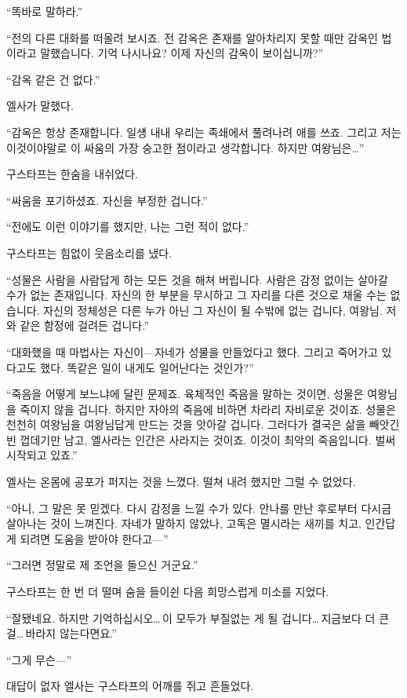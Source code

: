 ``똑바로 말하라.''

``전의 다른 대화를 떠올려 보시죠. 전 감옥은 존재를 알아차리지 못할 때만 감옥인 법이라고 말했습니다. 기억 나시나요? 이제 자신의 감옥이 보이십니까?''

``감옥 같은 건 없다.''

엘사가 말했다.

``감옥은 항상 존재합니다. 일섕 내내 우리는 족쇄에서 풀려나려 애를 쓰죠. 그리고 저는 이것이야말로 이 싸움의 가장 숭고한 점이라고 생각합니다. 하지만 여왕님은\ldots''

구스타프는 한숨을 내쉬었다.

``싸움을 포기하셨죠. 자신을 부정한 겁니다.''

``전에도 이런 이야기를 했지만, 나는 그런 적이 없다.''

구스타프는 힘없이 웃음소리를 냈다.

``성물은 사람을 사람답게 하는 모든 것을 해쳐 버립니다. 사람은 감정 없이는 살아갈 수가 없는 존재입니다. 자신의 한 부분을 무시하고 그 자리를 다른 것으로 채울 수는 없습니다. 자신의 정체성은 다른 누가 아닌 그 자신이 될 수밖에 없는 겁니다, 여왕님. 저와 같은 함정에 걸려든 겁니다.''

`` 대화했을 때 마법사는 자신이—자네가 성물을 만들었다고 했다. 그리고 죽어가고 있다고도 했다. 똑같은 일이 내게도 일어난다는 것인가?''

``죽음을 어떻게 보느냐에 달린 문제죠. 육체적인 죽음을 말하는 것이면, 성물은 여왕님을 죽이지 않을 겁니다. 하지만 자아의 죽음에 비하면 차라리 자비로운 것이죠. 성물은 천천히 여왕님을 여왕님답게 만드는 것을 앗아갈 겁니다. 그러다가 결국은 삶을 빼앗긴 빈 껍데기만 남고, 엘사라는 인간은 사라지는 것이죠. 이것이 최악의 죽음입니다. 벌써 시작되고 있죠.''

엘사는 온몸에 공포가 퍼지는 것을 느꼈다. 떨쳐 내려 했지만 그럴 수 없었다.

``아니, 그 말은 못 믿겠다. 다시 감정을 느낄 수가 있다. 안나를 만난 후로부터 다시금 살아나는 것이 느껴진다. 자네가 말하지 않았나, 고독은 멸시라는 새끼를 치고, 인간답게 되려면 도움을 받아야 한다고—''

``그러면 정말로 제 조언을 들으신 거군요.''

구스타프는 한 번 더 떨며 숨을 들이쉰 다음 희망스럽게 미소를 지었다.

``잘됐네요. 하지만 기억하십시오\ldots\,이 모두가 부질없는 게 될 겁니다\ldots\,지금보다 더 큰 걸\ldots\,바라지 않는다면요.''

``그게 무슨—''

대답이 없자 엘사는 구스타프의 어깨를 쥐고 흔들었다.

